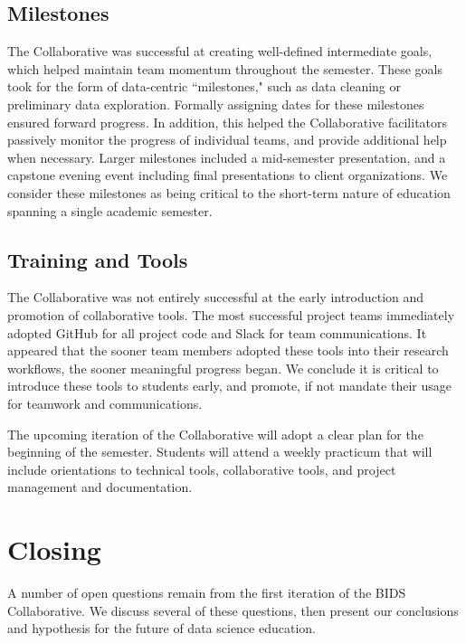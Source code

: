 \documentclass[12pt]{article}
\begin{document}
\subsection{Milestones}

The Collaborative was successful at creating well-defined intermediate goals, which helped maintain team momentum throughout the semester.  These goals took for the form of data-centric ``milestones," such as data cleaning or preliminary data exploration.  Formally assigning dates for these milestones ensured forward progress.  In addition, this helped the Collaborative facilitators passively monitor the progress of individual teams, and provide additional help when necessary.  Larger milestones included a mid-semester presentation, and a capstone evening event including final presentations to client organizations.  We consider these milestones as being critical to the short-term nature of education spanning a single academic semester.

\subsection{Training and Tools}

The Collaborative was not entirely successful at the early introduction and promotion of collaborative tools.  The most successful project teams immediately adopted GitHub for all project code and Slack for team communications.  It appeared that the sooner team members adopted these tools into their research workflows, the sooner meaningful progress began.  We conclude it is critical to introduce these tools to students early, and promote, if not mandate their usage for teamwork and communications.

The upcoming iteration of the Collaborative will adopt a clear plan for the beginning of the semester. Students will attend a weekly practicum that will include orientations to technical tools, collaborative tools, and project management and documentation.



\section{Closing}

A number of open questions remain from the first iteration of the BIDS Collaborative.  We discuss several of these questions, then present our conclusions and hypothesis for the future of data science education.
\end{document}
